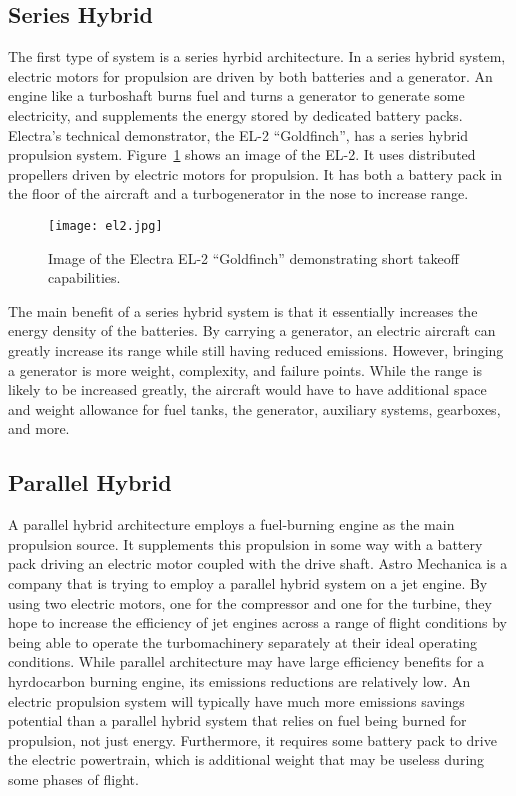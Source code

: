 \documentclass[journal]{new-aiaa}
\begin{document}
\subsection{Series Hybrid}
The first type of system is a series hyrbid architecture. In a series hybrid system, electric motors for propulsion are
driven by both batteries and a generator. An engine like a turboshaft burns fuel and turns a generator to generate some
electricity, and supplements the energy stored by dedicated battery packs. Electra's technical demonstrator, the EL-2
``Goldfinch'', has a series hybrid propulsion system. Figure~\ref{fig:el2} shows an image of the EL-2. It uses
distributed propellers driven by electric motors for propulsion. It has both a battery pack in the floor of the aircraft
and a turbogenerator in the nose to increase range.
\begin{figure}
    \centering
    \texttt{[image: el2.jpg]}
    \caption{Image of the Electra EL-2 ``Goldfinch'' demonstrating short takeoff capabilities.}
    \label{fig:el2}
\end{figure}
The main benefit of a series hybrid system is that it essentially increases the energy density of the batteries. By
carrying a generator, an electric aircraft can greatly increase its range while still having reduced emissions. However,
bringing a generator is more weight, complexity, and failure points. While the range is likely to be increased greatly,
the aircraft would have to have additional space and weight allowance for fuel tanks, the generator, auxiliary systems,
gearboxes, and more.

\subsection{Parallel Hybrid}
A parallel hybrid architecture employs a fuel-burning engine as the main propulsion source. It supplements this
propulsion in some way with a battery pack driving an electric motor coupled with the drive shaft. Astro Mechanica is a
company that is trying to employ a parallel hybrid system on a jet engine. By using two electric motors, one for the
compressor and one for the turbine, they hope to increase the efficiency of jet engines across a range of flight
conditions by being able to operate the turbomachinery separately at their ideal operating conditions. While parallel
architecture may have large efficiency benefits for a hyrdocarbon burning engine, its emissions reductions are
relatively low. An electric propulsion system will typically have much more emissions savings potential than a parallel
hybrid system that relies on fuel being burned for propulsion, not just energy. Furthermore, it requires some battery
pack to drive the electric powertrain, which is additional weight that may be useless during some phases of flight.
\end{document}

